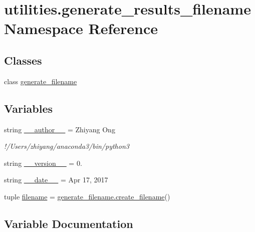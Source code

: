 \hypertarget{namespaceutilities_1_1generate__results__filename}{}\section{utilities.\+generate\+\_\+results\+\_\+filename Namespace Reference}
\label{namespaceutilities_1_1generate__results__filename}
\subsection*{Classes}
\begin{DoxyCompactItemize}
\item 
class \hyperlink{classutilities_1_1generate__results__filename_1_1generate__filename}{generate\+\_\+filename}
\end{DoxyCompactItemize}
\subsection*{Variables}
\begin{DoxyCompactItemize}
\item 
string \hyperlink{namespaceutilities_1_1generate__results__filename_ad6ef48cbe2a62d40da9c310ff84c9389}{\+\_\+\+\_\+author\+\_\+\+\_\+} = \textquotesingle{}Zhiyang Ong\textquotesingle{}
\begin{DoxyCompactList}\small\item\em !/\+Users/zhiyang/anaconda3/bin/python3 \end{DoxyCompactList}\item 
string \hyperlink{namespaceutilities_1_1generate__results__filename_a278d4471bcb9b4e800f698ee4492eac3}{\+\_\+\+\_\+version\+\_\+\+\_\+} = \textquotesingle{}0.\textquotesingle{}
\item 
string \hyperlink{namespaceutilities_1_1generate__results__filename_a26c03761d2937c6b0a2688c27fedd481}{\+\_\+\+\_\+date\+\_\+\+\_\+} = \textquotesingle{}Apr 17, 2017\textquotesingle{}
\item 
tuple \hyperlink{namespaceutilities_1_1generate__results__filename_a4ef8cf545152b32ed95983cba284b478}{filename} = \hyperlink{classutilities_1_1generate__results__filename_1_1generate__filename_a9856498ab965f56a941ff46415b48906}{generate\+\_\+filename.\+create\+\_\+filename}()
\end{DoxyCompactItemize}


\subsection{Variable Documentation}
\hypertarget{namespaceutilities_1_1generate__results__filename_ad6ef48cbe2a62d40da9c310ff84c9389}{}
